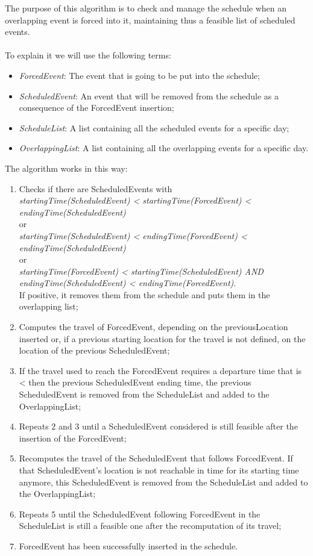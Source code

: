 The purpose of this algorithm is to check and manage the schedule when an overlapping event is forced into it, maintaining thus a feasible list of scheduled events. \\ \\
To explain it we will use the following terms: 
\begin{itemize}
	\item \textit{ForcedEvent}: The event that is going to be put into the schedule;
	\item \textit{ScheduledEvent}: An event that will be removed from the schedule as a consequence of the ForcedEvent insertion;
	\item \textit{ScheduleList}: A list containing all the scheduled events for a specific day;
	\item \textit{OverlappingList}: A list containing all the overlapping events for a specific day.
\end{itemize}

\noindent The algorithm works in this way:
\begin{enumerate}
	\item Checks if there are ScheduledEvents with \\ \textit{startingTime(ScheduledEvent) < startingTime(ForcedEvent) < endingTime(ScheduledEvent)} \\ or \\ \textit{startingTime(ScheduledEvent) < endingTime(ForcedEvent) < endingTime(ScheduledEvent)} \\
or \\ \textit{startingTime(ForcedEvent) < startingTime(ScheduledEvent) AND endingTime(ScheduledEvent) < endingTime(ForcedEvent)}. \\
	If positive, it removes them from the schedule and puts them in the overlapping list;
	\item Computes the travel of ForcedEvent, depending on the previousLocation inserted or, if a previous starting location for the travel is not defined, on the location of the previous ScheduledEvent;
	\item If the travel used to reach the ForcedEvent requires a departure time that is < then the previous ScheduledEvent ending time, the previous ScheduledEvent is removed from the ScheduleList and added to the OverlappingList;
	\item Repeats 2 and 3 until a ScheduledEvent considered is still feasible after the insertion of the ForcedEvent;
	\item Recomputes the travel of the ScheduledEvent that follows ForcedEvent. If that ScheduledEvent's location is not reachable in time for its starting time anymore, this ScheduledEvent is removed from the ScheduleList and added to the OverlappingList;
	\item Repeats 5 until the ScheduledEvent following ForcedEvent in the ScheduleList is still a feasible one after the recomputation of its travel;
	\item ForcedEvent has been successfully inserted in the schedule.
\end{enumerate}